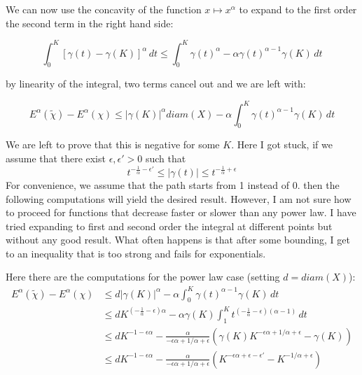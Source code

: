 \documentclass[11pt]{article}
\begin{document}
    We can now use the concavity of the function $x \mapsto x^\alpha$ to expand to the first order the second term in the right hand side:

    \begin{equation}
        \int_0^K \left[\gamma(t) - \gamma(K)\right]^\alpha \, dt \le \int_0^K \gamma(t)^\alpha - \alpha \gamma(t)^{\alpha - 1} \gamma(K) \, dt
    \end{equation}

    by linearity of the integral, two terms cancel out and we are left with:

    \begin{equation}
        E^\alpha(\tilde{\chi}) - E^\alpha(\chi) \le |\gamma(K)|^\alpha diam(X) - \alpha \int_0^K \gamma(t)^{\alpha - 1} \gamma(K) \, dt
    \end{equation}

    We are left to prove that this is negative for some $K$. Here I got stuck, if we assume that there exist $\epsilon,\epsilon' > 0$ such that
    $$t^{-\frac{1}{\alpha} - \epsilon'} \le |\gamma(t)| \le t^{-\frac{1}{\alpha} + \epsilon}$$
    For convenience, we assume that the path starts from 1 instead of 0.
    then the following computations will yield the desired result. However, I am not sure how to proceed for functions that decrease faster or slower than any power law.
    I have tried expanding to first and second order the integral at different points but without any good result. What often happens is that
    after some bounding, I get to an inequality that is too strong and fails for exponentials.

    Here there are the computations for the power law case (setting $d=diam(X)$):
    \begin{align*}
        E^\alpha(\tilde{\chi}) - E^\alpha(\chi) &\le d|\gamma(K)|^\alpha - \alpha \int_0^K \gamma(t)^{\alpha - 1} \gamma(K) \, dt \\
        &\le dK^{(-\frac{1}{\alpha} - \epsilon)\alpha} - \alpha\gamma(K)\int_1^K t^{(-\frac{1}{\alpha} - \epsilon)(\alpha - 1)} \, dt \\
        &\le dK^{-1 - \epsilon\alpha} - \frac{\alpha}{-\epsilon\alpha + 1/\alpha + \epsilon} \left( \gamma(K) K^{-\epsilon\alpha + 1/\alpha + \epsilon} - \gamma(K) \right) \\
        &\le dK^{-1 - \epsilon\alpha} - \frac{\alpha}{-\epsilon\alpha + 1/\alpha + \epsilon} \left( K^{-\epsilon\alpha + \epsilon - \epsilon'} - K^{-1/\alpha + \epsilon} \right) \\
    \end{align*}
\end{document}
